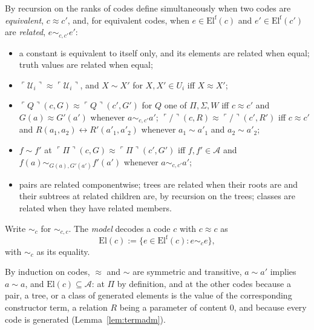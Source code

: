 \documentclass[10pt]{article}
\newcommand{\El}{\mathrm{El}}
\newcommand{\code}[1]{\ulcorner #1\urcorner}
\newcommand{\U}{\mathcal{U}}
\begin{document}
\begin{definition}\label{def:per}
By recursion on the ranks of codes define simultaneously when two codes
are \emph{equivalent}, $c\approx c'$, and, for equivalent codes, when
$e\in\El^{\mathrm f}(c)$ and $e'\in\El^{\mathrm f}(c')$ are
\emph{related}, $e\sim_{c,c'}e'$:
\begin{itemize}
\item a constant is equivalent to itself only, and its elements are
  related when equal; truth values are related when equal;
\item $\code{\U_i}\approx\code{\U_i}$, and $X\sim X'$ for $X,X'\in U_i$
  iff $X\approx X'$;
\item $\code Q(c,G)\approx\code Q(c',G')$ for $Q$ one of $\Pi,\Sigma,W$ iff
  $c\approx c'$ and $G(a)\approx G'(a')$ whenever $a\sim_{c,c'}a'$;
  $\code/(c,R)\approx\code/(c',R')$ iff $c\approx c'$ and
  $R(a_1,a_2)\leftrightarrow R'(a'_1,a'_2)$ whenever
  $a_1\sim a'_1$ and $a_2\sim a'_2$;
\item $f\sim f'$ at $\code\Pi(c,G)\approx\code\Pi(c',G')$ iff
  $f,f'\in\mathcal A$ and $f(a)\sim_{G(a),G'(a')}f'(a')$ whenever
  $a\sim_{c,c'}a'$;
\item pairs are related componentwise; trees are related when their
  roots are and their subtrees at related children are, by recursion on
  the trees; classes are related when they have related members.
\end{itemize}
Write $\sim_c$ for $\sim_{c,c}$. The \emph{model} decodes a code $c$ with
$c\approx c$ as
\[
\El(c):=\{e\in\El^{\mathrm f}(c):e\sim_ce\},
\]
with $\sim_c$ as its equality.
\end{definition}

By induction on codes, $\approx$ and $\sim$ are symmetric and
transitive, $a\sim a'$ implies $a\sim a$, and $\El(c)\subseteq\mathcal A$:
at $\Pi$ by definition, and at the other codes because a pair, a tree,
or a class of generated elements is the value of the corresponding
constructor term, a relation $R$ being a parameter of content $0$, and
because every code is generated (Lemma~\ref{lem:termadm}).
\end{document}
